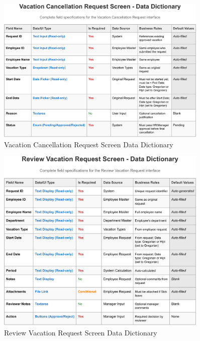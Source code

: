 \documentclass[12pt,a4paper]{article}
\begin{document}
\begin{figure}[H]
\centering
\includegraphics[width=0.9\textwidth]{Data-Dictionary/Screen-Data-Dictionaries/Vacation-Cancellation-Request-Screen-Data-Dictionary/Vacation-Cancellation-Request-Screen-Data-Dictionary-1.png}
\caption{Vacation Cancellation Request Screen Data Dictionary}
\label{fig:vacation-cancellation-data-dict}
\end{figure}

\begin{figure}[H]
\centering
\includegraphics[width=0.9\textwidth]{Data-Dictionary/Screen-Data-Dictionaries/Review-Vacation-Request-Screen-Data-Dictionary/Review-Vacation-Request-Screen-Data-Dictionary-1.png}
\caption{Review Vacation Request Screen Data Dictionary}
\label{fig:review-vacation-data-dict}
\end{figure}
\end{document}
